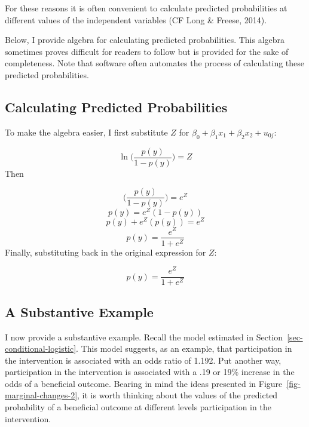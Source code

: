 \documentclass[
  letterpaper,
  DIV=11,
  numbers=noendperiod]{scrreprt}
\begin{document}
For these reasons it is often convenient to calculate predicted
probabilities at different values of the independent variables (CF Long
\& Freese, 2014). 

\begin{tcolorbox}[enhanced jigsaw, coltitle=black, titlerule=0mm, colframe=quarto-callout-tip-color-frame, opacitybacktitle=0.6, toprule=.15mm, colback=white, bottomrule=.15mm, opacityback=0, breakable, title=\textcolor{quarto-callout-tip-color}{\faLightbulb}\hspace{0.5em}{The Algebra May Be Helpful}, bottomtitle=1mm, toptitle=1mm, arc=.35mm, leftrule=.75mm, colbacktitle=quarto-callout-tip-color!10!white, rightrule=.15mm, left=2mm]

Below, I provide algebra for calculating predicted probabilities. This
algebra sometimes proves difficult for readers to follow but is provided
for the sake of completeness. Note that software often automates the
process of calculating these predicted probabilities.

\end{tcolorbox}

\subsection{Calculating Predicted
Probabilities}\label{calculating-predicted-probabilities}

To make the algebra easier, I first substitute \(Z\) for
\(\beta_0 + \beta_1 x_1 + \beta_2 x_2 + u_{0j}\):

\[\ln\Big(\frac{p(y)}{1-p(y)}\Big) = Z\] Then

\[\Big(\frac{p(y)}{1-p(y)}\Big) = e^Z\] \[p(y) = e^Z(1-p(y))\]
\[p(y) + e^Z(p(y)) = e^Z\] \[p(y) = \frac{e^Z}{1+e^Z}\] Finally,
substituting back in the original expression for \(Z\):

\[p(y) = \frac{e^Z}{1+e^Z}\]

\subsection{A Substantive Example}\label{a-substantive-example}

I now provide a substantive example. Recall the model estimated in
Section~\ref{sec-conditional-logistic}. This model suggests, as an
example, that participation in the intervention is associated with an
odds ratio of 1.192. Put another way, participation in the intervention
is associated with a .19 or 19\% increase in the odds of a beneficial
outcome. Bearing in mind the ideas presented in
Figure~\ref{fig-marginal-changes-2}, it is worth thinking about the
values of the predicted probability of a beneficial outcome at different
levels participation in the intervention.
\end{document}
